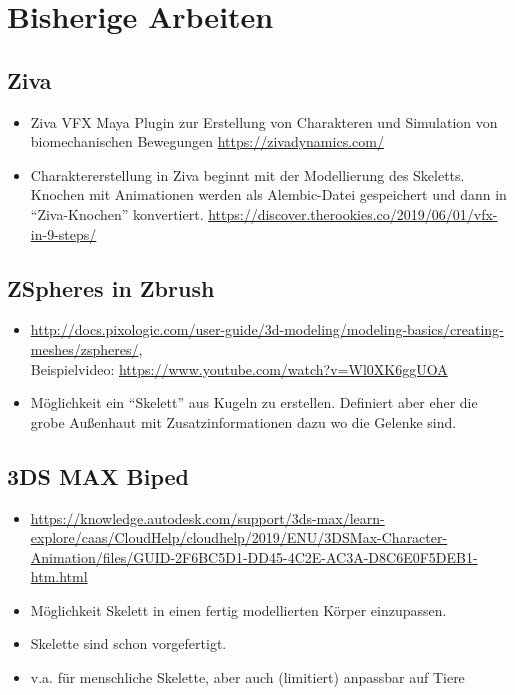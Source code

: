 
\chapter{Bisherige Arbeiten}

\section{Ziva}

\begin{itemize}
 \item Ziva VFX Maya Plugin zur Erstellung von Charakteren und Simulation von biomechanischen Bewegungen \url{https://zivadynamics.com/}
 \item Charaktererstellung in Ziva beginnt mit der Modellierung des Skeletts. Knochen mit Animationen werden als Alembic-Datei gespeichert und dann in "`Ziva-Knochen"' konvertiert. \url{https://discover.therookies.co/2019/06/01/vfx-in-9-steps/}
\end{itemize}

\section{ZSpheres in Zbrush}

\begin{itemize}
 \item \url{http://docs.pixologic.com/user-guide/3d-modeling/modeling-basics/creating-meshes/zspheres/},\\ Beispielvideo: \url{https://www.youtube.com/watch?v=Wl0XK6ggUOA}
 \item Möglichkeit ein "`Skelett"' aus Kugeln zu erstellen. Definiert aber eher die grobe Außenhaut mit Zusatzinformationen dazu wo die Gelenke sind.
\end{itemize}

\section{3DS MAX Biped}

\begin{itemize}
 \item \url{https://knowledge.autodesk.com/support/3ds-max/learn-explore/caas/CloudHelp/cloudhelp/2019/ENU/3DSMax-Character-Animation/files/GUID-2F6BC5D1-DD45-4C2E-AC3A-D8C6E0F5DEB1-htm.html}
 \item Möglichkeit Skelett in einen fertig modellierten Körper einzupassen. 
 \item Skelette sind schon vorgefertigt.
 \item v.a. für menschliche Skelette, aber auch (limitiert) anpassbar auf Tiere
\end{itemize}

